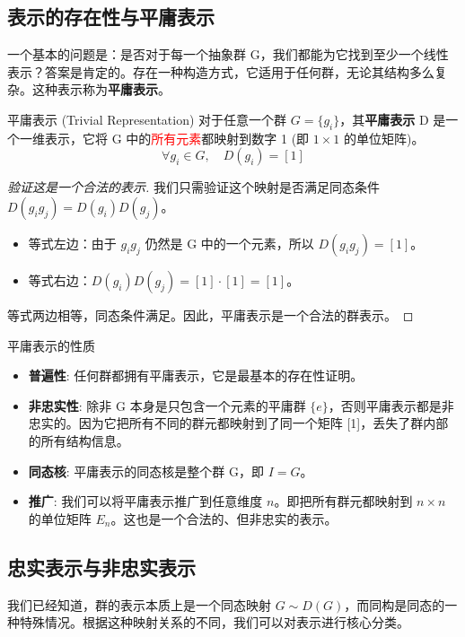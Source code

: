 \subsection{表示的存在性与平庸表示}
一个基本的问题是：是否对于每一个抽象群 G，我们都能为它找到至少一个线性表示？答案是肯定的。存在一种构造方式，它适用于任何群，无论其结构多么复杂。这种表示称为\textbf{平庸表示}。

\begin{definition}{平庸表示 (Trivial Representation)}
    对于任意一个群 $G=\{g_i\}$，其\textbf{平庸表示} D 是一个一维表示，它将 G 中的\textcolor{red}{所有元素}都映射到数字 1 (即 $1 \times 1$ 的单位矩阵)。
    $$
        \forall g_i \in G, \quad D(g_i) = [1]
    $$
\end{definition}

\begin{proof}[验证这是一个合法的表示]
    我们只需验证这个映射是否满足同态条件 $D(g_i g_j) = D(g_i)D(g_j)$。
    \begin{itemize}
        \item 等式左边：由于 $g_i g_j$ 仍然是 G 中的一个元素，所以 $D(g_i g_j) = [1]$。
        \item 等式右边：$D(g_i)D(g_j) = [1] \cdot [1] = [1]$。
    \end{itemize}
    等式两边相等，同态条件满足。因此，平庸表示是一个合法的群表示。
\end{proof}

\begin{note}{平庸表示的性质}
    \begin{itemize}
        \item \textbf{普遍性}: 任何群都拥有平庸表示，它是最基本的存在性证明。
        \item \textbf{非忠实性}: 除非 G 本身是只包含一个元素的平庸群 $\{e\}$，否则平庸表示都是非忠实的。因为它把所有不同的群元都映射到了同一个矩阵 [1]，丢失了群内部的所有结构信息。
        \item \textbf{同态核}: 平庸表示的同态核是整个群 G，即 $I = G$。
        \item \textbf{推广}: 我们可以将平庸表示推广到任意维度 $n$。即把所有群元都映射到 $n \times n$ 的单位矩阵 $E_n$。这也是一个合法的、但非忠实的表示。
    \end{itemize}
\end{note}





\subsection{忠实表示与非忠实表示}
我们已经知道，群的表示本质上是一个同态映射 $G \sim D(G)$，而同构是同态的一种特殊情况。根据这种映射关系的不同，我们可以对表示进行核心分类。

